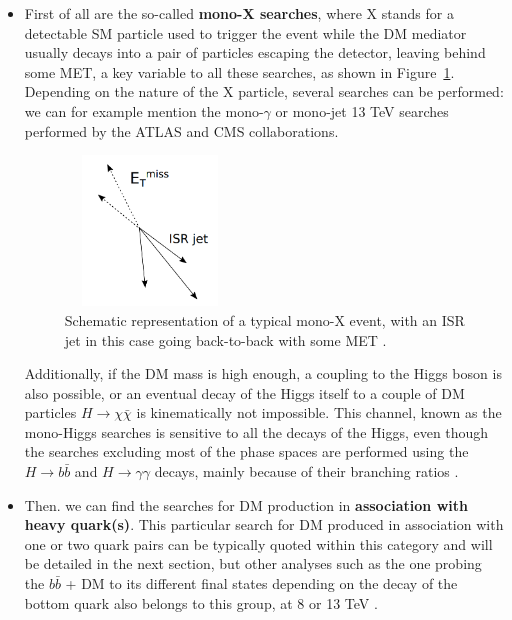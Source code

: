 \documentclass[a4paper, 10pt, openright]{report}
\begin{document}
\begin{itemize}
\item First of all are the so-called \textbf{mono-X searches}, where X stands for a detectable \ac{SM} particle used to trigger the event while the \ac{DM} mediator usually decays into a pair of particles escaping the detector, leaving behind some \ac{MET}, a key variable to all these searches, as shown in Figure~\ref{fig:MonoX}. Depending on the nature of the X particle, several searches can be performed: we can for example mention the mono-$\gamma$ \cite{MonoGammaAtlas, MonoGammaCMS} or mono-jet \cite{MonoJetCMS, MonoJetCMS2} 13 TeV searches performed by the \ac{ATLAS} and \ac{CMS} collaborations.

\begin{figure}[htbp]
\begin{center}
\includegraphics[width=4.5cm, height=4cm]{figs/MonoX.png}
\caption{Schematic representation of a typical mono-X event, with an \ac{ISR} jet in this case going back-to-back with some \ac{MET} \cite{ColliderSearches}.}
\label{fig:MonoX}
\end{center}
\end{figure}

Additionally, if the \ac{DM} mass is high enough, a coupling to the Higgs boson is also possible, or an eventual decay of the Higgs itself to a couple of \ac{DM} particles $H \rightarrow \chi \bar \chi$ is kinematically not impossible. This channel, known as the mono-Higgs searches is sensitive to all the decays of the Higgs, even though the searches excluding most of the phase spaces are performed using the $H \rightarrow b \bar b$ and $H \rightarrow \gamma \gamma$ decays, mainly because of their branching ratios \cite{MonoHiggsAtlas, MonoHiggsCMS}. 

\item Then. we can find the searches for \ac{DM} production in \textbf{association with heavy quark(s)}. This particular search for \ac{DM} produced in association with one or two quark pairs can be typically quoted within this category and will be detailed in the next section, but other analyses such as the one probing the $b \bar b$ + DM to its different final states depending on the decay of the bottom quark also belongs to this group, at 8 or 13 TeV \cite{PreviousDoubleTopAllLep8ATLAS, PreviousDoubleTopBottomAllLep13ATLAS}. 


\end{itemize}
\end{document}
